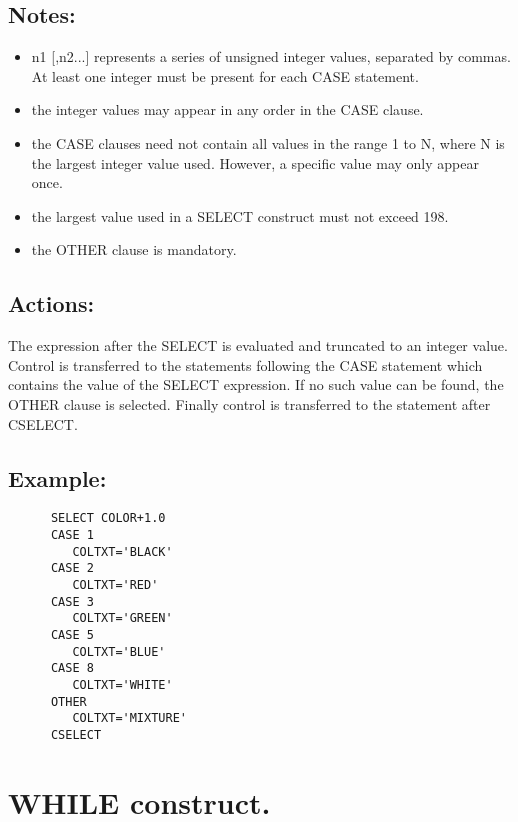 \subsection{Notes:}
\begin{itemize}

\item n1 [,n2...] represents a series of unsigned integer values,
separated by commas.  At least one integer must be present for each CASE
statement. 

\item the integer values may appear in any order in the CASE clause. 

\item the CASE clauses need not contain all values in the range 1 to N,
where N is the largest integer value used.  However, a specific value
may only appear once. 

\item the largest value used in a SELECT construct must not exceed 198. 

\item the OTHER clause is mandatory. 

\end{itemize}
\subsection{Actions:}

The expression after the SELECT is evaluated and truncated to an integer
value.  Control is transferred to the statements following the CASE
statement which contains the value of the SELECT expression.  If no such
value can be found, the OTHER clause is selected.  Finally control is
transferred to the statement after CSELECT. 

\subsection{Example:}
\begin{verbatim}
      SELECT COLOR+1.0
      CASE 1
         COLTXT='BLACK'
      CASE 2
         COLTXT='RED'
      CASE 3
         COLTXT='GREEN'
      CASE 5
         COLTXT='BLUE' 
      CASE 8
         COLTXT='WHITE'
      OTHER 
         COLTXT='MIXTURE'
      CSELECT 
\end{verbatim}

\section{WHILE construct.}
